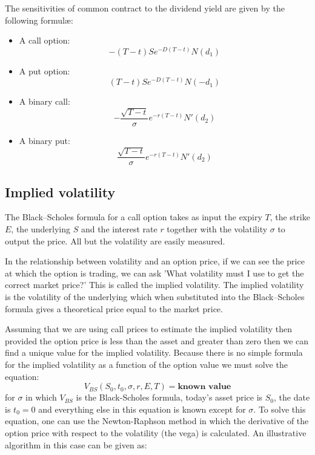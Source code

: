 The sensitivities of common contract to the dividend yield are given by the following formul{\ae}:
\begin{itemize}
	\setlength\itemsep{0em}
	\item A call option:
	\begin{equation}
		-(T-t) S e^{-D(T-t)} N(d_1)
	\end{equation}
	\item A put option:
	\begin{equation}
		(T-t) S e^{-D(T-t)} N(-d_1)
	\end{equation}
	\item A binary call:
	\begin{equation}
		-\frac{\sqrt{T-t}}{\sigma} e^{-r(T-t)} N'(d_2)
	\end{equation}
	\item A binary put:
	\begin{equation}
	 	\frac{\sqrt{T-t}}{\sigma} e^{-r(T-t)} N'(d_2)
	\end{equation}
\end{itemize}



\subsection{Implied volatility}
The Black–Scholes formula for a call option takes as input the expiry $T$, the strike $E$, the underlying $S$ and the interest rate $r$ together with the volatility $\sigma$ to output the price. All but the volatility are easily measured.

In the relationship between volatility and an option price, if we can see the price at which the option is trading, we can ask 'What volatility must I use to get the correct market price?' This is called the implied volatility. The implied volatility is the volatility of the underlying which when substituted into the Black–Scholes formula gives a theoretical price equal to the market price. 

Assuming that we are using call prices to estimate the implied volatility then provided the option price is less than the asset and greater than zero then we can find a unique value for the implied volatility. Because there is no simple formula for the implied volatility as a function of the option value we must solve the equation:
\begin{equation}
    V_{BS} \left( S_0, t_0, \sigma, r, E, T \right) = \textbf{known value}
\end{equation}
for $\sigma$ in which $V_{BS}$ is the Black-Scholes formula, today's asset price is $S_0$, the date is $t_0 = 0$ and everything else in this equation is known except for $\sigma$. To solve this equation, one can use the Newton-Raphson method in which the derivative of the option price with respect to the volatility (the vega) is calculated. An illustrative algorithm in this case can be given as:

